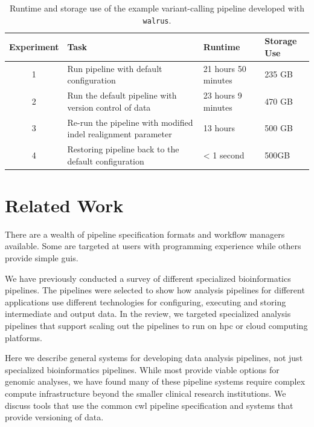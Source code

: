 \begin{table}[ht!]
    \centering
    \caption{Runtime and storage use of the example variant-calling pipeline
    developed with \texttt{walrus}.} 
    \begin{tabular}{ | c | p{4cm} | p{2cm} | p{2cm} |}
    \hline
    Experiment & Task & Runtime & Storage Use \\ \hline
    1 & Run pipeline with default configuration & 21 hours 50 minutes & 235 GB
        \\ \hline
    2 & Run the default pipeline with version control of data & 23 hours 9
        minutes & 470 GB \\ \hline
    3 & Re-run the pipeline with modified indel realignment parameter & 13 hours
        & 500 GB \\ \hline
    4 & Restoring pipeline back to the default configuration & < 1 second &
        500GB \\ \hline
    \end{tabular}
    \label{resultstable}
\end{table}




\section{Related Work} 
There are a wealth of pipeline specification formats and workflow managers
available. Some are targeted at users with programming experience while others
provide simple \glspl{gui}. 

We have previously conducted a survey of different
specialized bioinformatics pipelines.\cite{fjukstad2017review} 
The pipelines were selected to show how analysis pipelines for different
applications use different technologies for configuring, executing and storing
intermediate and output data. In the review, we targeted specialized analysis
pipelines that support scaling out the pipelines to run on \gls{hpc} or cloud
computing platforms. 

Here we describe general systems for developing data analysis
pipelines, not just specialized bioinformatics pipelines. While most provide
viable options for genomic analyses, we have found many of these pipeline
systems require complex compute infrastructure beyond the smaller clinical
research institutions.  We discuss tools that use the common \gls{cwl} pipeline
specification and systems that provide versioning of data. 

